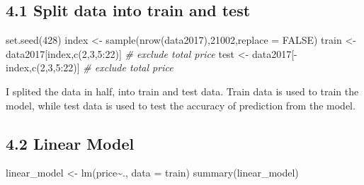 \documentclass[
]{article}
\newenvironment{Shaded}{\begin{snugshade}}{\end{snugshade}}
\newcommand{\AttributeTok}[1]{\textcolor[rgb]{0.77,0.63,0.00}{#1}}
\newcommand{\CommentTok}[1]{\textcolor[rgb]{0.56,0.35,0.01}{\textit{#1}}}
\newcommand{\ConstantTok}[1]{\textcolor[rgb]{0.00,0.00,0.00}{#1}}
\newcommand{\DecValTok}[1]{\textcolor[rgb]{0.00,0.00,0.81}{#1}}
\newcommand{\FunctionTok}[1]{\textcolor[rgb]{0.00,0.00,0.00}{#1}}
\newcommand{\NormalTok}[1]{#1}
\newcommand{\OtherTok}[1]{\textcolor[rgb]{0.56,0.35,0.01}{#1}}
\newcommand{\SpecialCharTok}[1]{\textcolor[rgb]{0.00,0.00,0.00}{#1}}
\begin{document}
\hypertarget{split-data-into-train-and-test}{%
\subsection{4.1 Split data into train and
test}\label{split-data-into-train-and-test}}

\begin{Shaded}
\begin{Highlighting}[]
\FunctionTok{set.seed}\NormalTok{(}\DecValTok{428}\NormalTok{)}
\NormalTok{index }\OtherTok{\textless{}{-}} \FunctionTok{sample}\NormalTok{(}\FunctionTok{nrow}\NormalTok{(data2017),}\DecValTok{21002}\NormalTok{,}\AttributeTok{replace =} \ConstantTok{FALSE}\NormalTok{)}
\NormalTok{train }\OtherTok{\textless{}{-}}\NormalTok{ data2017[index,}\FunctionTok{c}\NormalTok{(}\DecValTok{2}\NormalTok{,}\DecValTok{3}\NormalTok{,}\DecValTok{5}\SpecialCharTok{:}\DecValTok{22}\NormalTok{)] }\CommentTok{\# exclude total price }
\NormalTok{test }\OtherTok{\textless{}{-}}\NormalTok{ data2017[}\SpecialCharTok{{-}}\NormalTok{index,}\FunctionTok{c}\NormalTok{(}\DecValTok{2}\NormalTok{,}\DecValTok{3}\NormalTok{,}\DecValTok{5}\SpecialCharTok{:}\DecValTok{22}\NormalTok{)] }\CommentTok{\# exclude total price}
\end{Highlighting}
\end{Shaded}

I splited the data in half, into train and test data. Train data is used
to train the model, while test data is used to test the accuracy of
prediction from the model.

\hypertarget{linear-model}{%
\subsection{4.2 Linear Model}\label{linear-model}}

\begin{Shaded}
\begin{Highlighting}[]
\NormalTok{linear\_model }\OtherTok{\textless{}{-}} \FunctionTok{lm}\NormalTok{(price}\SpecialCharTok{\textasciitilde{}}\NormalTok{., }\AttributeTok{data =}\NormalTok{ train)}
\FunctionTok{summary}\NormalTok{(linear\_model)}
\end{Highlighting}
\end{Shaded}
\end{document}
